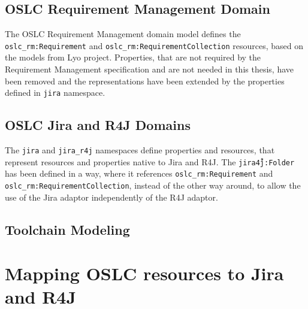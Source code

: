 
\subsection*{OSLC Requirement Management Domain}
The OSLC Requirement Management domain model defines the \texttt{oslc\_rm:Requirement} and \texttt{oslc\_rm:RequirementCollection} resources, based on the models from Lyo project. Properties, that are not required by the Requirement Management specification and are not needed in this thesis, have been removed and the representations have been extended by the properties defined in \texttt{jira} namespace.


\subsection*{OSLC Jira and R4J Domains}
The \texttt{jira} and \texttt{jira\_r4j} namespaces define properties and resources, that represent resources and properties native to Jira and R4J. The \texttt{jira\r4j:Folder} has been defined in a way, where it references \texttt{oslc\_rm:Requirement} and \texttt{oslc\_rm:RequirementCollection}, instead of the other way around, to allow the use of the Jira adaptor independently of the R4J adaptor.


\subsection{Toolchain Modeling}


\section{Mapping OSLC resources to Jira and R4J}

